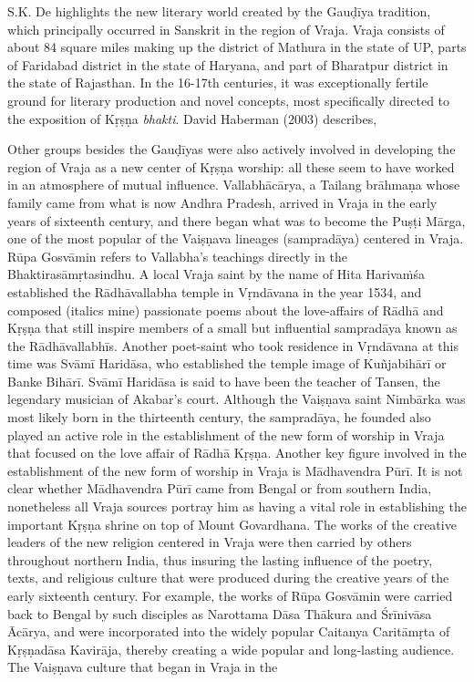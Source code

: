 S.K. De highlights the new literary world created by the Gauḍīya tradition, which principally occurred in Sanskrit in the region of Vraja. Vraja consists of about 84 square miles making up the district of Mathura in the state of UP, parts of Faridabad district in the state of Haryana, and part of Bharatpur district in the state of Rajasthan. In the 16-17th centuries, it was exceptionally fertile ground for literary production and novel concepts, most specifically directed to the exposition of Kṛṣṇa {\sl bhakti}. David Haberman (2003) describes, 
\begin{myquote}
\eleven
Other groups besides the Gauḍīyas were also actively involved in developing the region of Vraja as a new center of Kṛṣṇa worship: all these seem to have worked in an atmosphere of mutual influence. Vallabhācārya, a Tailang brāhmaṇa whose family came from what is now Andhra Pradesh, arrived in Vraja in the early years of sixteenth century, and there began what was to become the Puṣṭi Mārga, one of the most popular of the Vaiṣṇava lineages (sampradāya) centered in Vraja. Rūpa Gosvāmin refers to Vallabha’s teachings directly in the Bhaktirasāmṛtasindhu. A local Vraja saint by the name of Hita Harivaṁśa established the Rādhāvallabha temple in Vṛndāvana in the year 1534, and composed (italics mine) passionate poems about the love-affairs of Rādhā and Kṛṣṇa that still inspire members of a small but influential sampradāya known as the Rādhāvallabhīs. Another poet-saint who took residence in Vṛndāvana at this time was Svāmī Haridāsa, who established the temple image of Kuñjabihārī or Banke Bihārī. Svāmī Haridāsa is said to have been the teacher of Tansen, the legendary musician of Akabar’s court. Although the Vaiṣṇava saint Nimbārka was most likely born in the thirteenth century, the sampradāya, he founded also played an active role in the establishment of the new form of worship in Vraja that focused on the love affair of Rādhā Kṛṣṇa. Another key figure involved in the establishment of the new form of worship in Vraja is Mādhavendra Pūrī. It is not clear whether Mādhavendra Pūrī came from Bengal or from southern India, nonetheless all Vraja sources portray him as having a vital role in establishing the important Kṛṣṇa shrine on top of Mount Govardhana. The works of the creative leaders of the new religion centered in Vraja were then carried by others throughout northern India, thus insuring the lasting influence of the poetry, texts, and religious culture that were produced during the creative years of the early sixteenth century. For example, the works of Rūpa Gosvāmin were carried back to Bengal by such disciples as Narottama Dāsa Thākura and Śrīnivāsa Ācārya, and were incorporated into the widely popular Caitanya Caritāmṛta of Kṛṣṇadāsa Kavirāja, thereby creating a wide popular and long-lasting audience. The Vaiṣṇava culture that began in Vraja in the 
\end{myquote}
